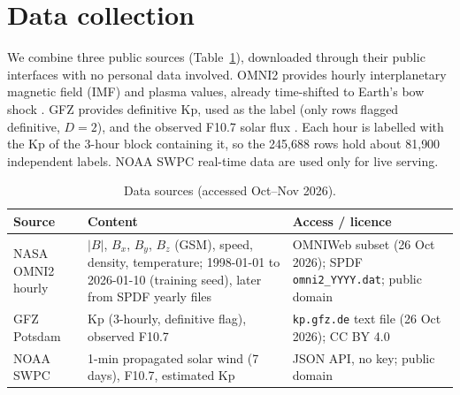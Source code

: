 \documentclass[11pt,a4paper]{article}
\newcommand{\code}[1]{\texttt{\small #1}}
\begin{document}
\section{Data collection}
We combine three public sources (Table~\ref{tab:data}), downloaded through their public interfaces with no personal
data involved. OMNI2 provides hourly interplanetary magnetic field (IMF) and plasma values, already time-shifted to
Earth's bow shock \cite{king2005}. GFZ provides definitive Kp, used as the label (only rows flagged definitive,
$D=2$), and the observed F10.7 solar flux \cite{gfzkp,tapping2013}. Each hour is labelled with the Kp of the 3-hour
block containing it, so the 245{,}688 rows hold about 81{,}900 independent labels. NOAA SWPC real-time data \cite{swpc} are
used only for live serving.

\begin{table}[htbp]\centering\small
\caption{Data sources (accessed Oct--Nov 2026).}\label{tab:data}
\begin{tabular}{@{}p{2.6cm}p{8.4cm}p{5.6cm}@{}}\toprule
Source & Content & Access / licence\\\midrule
NASA OMNI2 hourly & $|B|$, $B_x$, $B_y$, $B_z$ (GSM), speed, density, temperature; 1998-01-01 to 2026-01-10 (training seed), later from SPDF yearly files &
OMNIWeb subset (26 Oct 2026); SPDF \code{omni2\_YYYY.dat}; public domain\\
GFZ Potsdam & Kp (3-hourly, definitive flag), observed F10.7 & \code{kp.gfz.de} text file (26 Oct 2026); CC BY 4.0\\
NOAA SWPC & 1-min propagated solar wind (7 days), F10.7, estimated Kp & JSON API, no key; public domain\\\bottomrule
\end{tabular}\vspace{-2pt}
\end{table}
\end{document}

